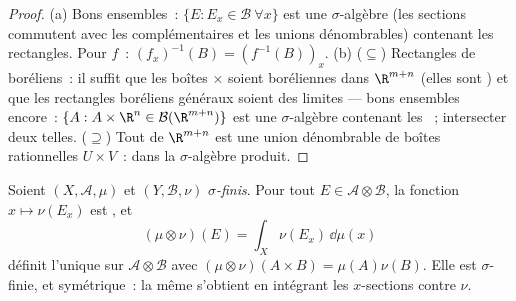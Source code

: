 \begin{proof}
(a) Bons ensembles~: $\{E : E_x \in \mathcal B\ \forall x\}$ est
une $\sigma$-algèbre (les sections commutent avec les
complémentaires et les unions dénombrables) contenant les
rectangles. Pour $f$~: $(f_x)^{-1}(B) = (f^{-1}(B))_x$.
(b) ($\subseteq$) Rectangles de boréliens~: il suffit que les
boîtes $\times$ soient boréliennes dans $\R^{m+n}$
(elles sont ) et que les rectangles boréliens généraux
soient des limites --- bons ensembles encore~: $\{A :
A\times\R^n \in \mathcal B(\R^{m+n})\}$ est une
$\sigma$-algèbre contenant les ~; intersecter deux
telles. ($\supseteq$) Tout  de $\R^{m+n}$ est une union
dénombrable de boîtes  rationnelles $U\times V$~:
 dans la $\sigma$-algèbre produit.
\end{proof}

\begin{theorem}\label{thm:b3:product:existence}
Soient $(X, \mathcal A, \mu)$ et $(Y, \mathcal B, \nu)$
\emph{$\sigma$-finis}. Pour tout $E \in \mathcal
A\otimes\mathcal B$, la fonction $x \mapsto \nu(E_x)$ est
, et
\[
(\mu\otimes\nu)(E) = \int_X \nu(E_x)\,\dd\mu(x)
\]
définit l'unique  sur $\mathcal A\otimes\mathcal B$ avec
$(\mu\otimes\nu)(A\times B) = \mu(A)\nu(B)$. Elle est
$\sigma$-finie, et symétrique~: la même  s'obtient en
intégrant les $x$-sections contre $\nu$.
\end{theorem}

